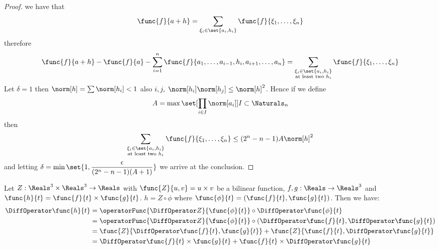 \begin{proof}
    we have that
    \begin{equation*}
        \func{f}{a + h} = \sum_{\xi_i \in \set{a_i,h_i}} \func{f}{\xi_1, \dots , \xi_n}
    \end{equation*}
    therefore
    \begin{equation*}
        \func{f}{a + h} - \func{f}{a} - \sum_{i = 1}^{n} \func{f}{a_1, \dots, a_{i-1}, h_i, a_{i+1}, \dots , a_n} = \sum_{\substack{\xi_i \in \set{a_i,h_i} \\ \text{at least two \(h_i\)}}} \func{f}{\xi_1, \dots , \xi_n}
    \end{equation*}
    Let \(\delta = 1\) then  \(\norm[h] = \sum \norm[h_i] < 1\) also \(i,j, \; \norm[h_i]\norm[h_j] \leq \norm[h]^2\). Hence if we define
    \begin{equation*}
        A = \max \set[\prod_{i \in I} {\norm[a_i]}]{I \subset \Naturals_n}
    \end{equation*}
    then
    \begin{equation*}
        \sum_{\substack{\xi_i \in \set{a_i,h_i} \\ \text{at least two \(h_i\)}}} \func{f}{\xi_1, \dots , \xi_n} \leq (2^n - n - 1)A \norm[h]^2
    \end{equation*}
    and letting \(\delta = \min \set{1 , \dfrac{\epsilon}{(2^n - n - 1)(A + 1)}}\) we arrive at the conclusion.
\end{proof}

\begin{example}
    Let \(Z: \Reals^3 \times \Reals^3 \to \Reals\) with \(\func{Z}{u,v}= u \times v\) be a bilinear function, \(f,g: \Reals \to \Reals^3\) and \(\func{h}{t} = \func{f}{t} \times \func{g}{t}\). \(h = Z \circ \phi\) where \(\func{\phi}{t} = (\func{f}{t},\func{g}{t})\). Then we have:
    \begin{align*}
        \DiffOperator \func{h}{t} & = \operatorFunc{\DiffOperator Z}{\func{\phi}{t}}\circ \DiffOperator \func{\phi}{t}                             \\
                                  & =  \operatorFunc{\DiffOperator Z}{\func{\phi}{t}} \circ (\DiffOperator \func{f}{t}, \DiffOperator \func{g}{t}) \\
                                  & = \func{Z}{\DiffOperator \func{f}{t}, \func{g}{t}} + \func{Z}{ \func{f}{t}, \DiffOperator \func{g}{t}}         \\
                                  & = \DiffOperator \func{f}{t} \times \func{g}{t} + \func{f}{t} \times \DiffOperator \func{g}{t}
    \end{align*}
\end{example}

